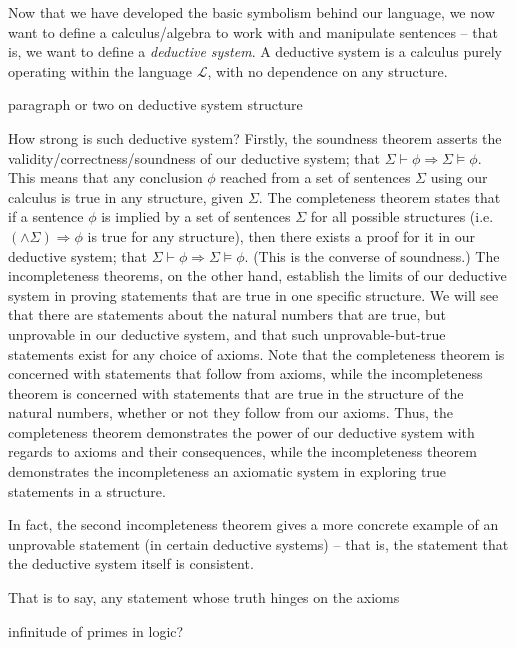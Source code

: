 \documentclass{article}
\theoremstyle{definition}
\begin{document}
Now that we have developed the basic symbolism behind our language, we now want to define a calculus/algebra to work with and manipulate sentences -- that is, we want to define a \emph{deductive system}. A deductive system is a calculus purely operating within the language $\mathcal{L}$, with no dependence on any structure. \par

paragraph or two on deductive system structure ~ \par

How strong is such deductive system? Firstly, the soundness theorem asserts the validity/correctness/soundness of our deductive system; that $\Sigma\vdash\phi\Rightarrow\Sigma\models\phi$. This means that any conclusion $\phi$ reached from a set of sentences $\Sigma$ using our calculus is true in any structure, given $\Sigma$.
The completeness theorem states that if a sentence $\phi$ is implied by a set of sentences $\Sigma$ for all possible structures (i.e. $(\land \Sigma)\Rightarrow\phi$ is true for any structure), then there exists a proof for it in our deductive system; that $\Sigma\vdash\phi\Rightarrow\Sigma\models\phi$. (This is the converse of soundness.) The incompleteness theorems, on the other hand, establish the limits of our deductive system in proving statements that are true in one specific structure. We will see that there are statements about the natural numbers that are true, but unprovable in our deductive system, and that such unprovable-but-true statements exist for any choice of axioms. Note that the completeness theorem is concerned with statements that follow from axioms, while the incompleteness theorem is concerned with statements that are true in the structure of the natural numbers, whether or not they follow from our axioms. Thus, the completeness theorem demonstrates the power of our deductive system with regards to axioms and their consequences, while the incompleteness theorem demonstrates the incompleteness an axiomatic system in exploring true statements in a structure.\par

In fact, the second incompleteness theorem gives a more concrete example of an unprovable statement (in certain deductive systems) -- that is, the statement that the deductive system itself is consistent.

That is to say, any statement whose truth hinges on the axioms 

infinitude of primes in logic?
\end{document}
